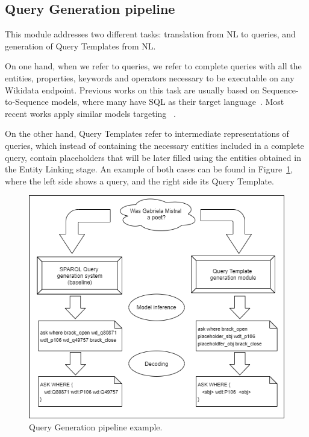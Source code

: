 \subsection{Query Generation pipeline}
\label{cap3:system/queryGenModule/pipeline}
This module addresses two different tasks: translation from NL to \SPARQL{} queries, and 
generation of Query Templates from NL. 

On one hand, when we refer to \SPARQL{} queries, we refer to complete queries with all the 
entities, properties, \SPARQL{} keywords and operators necessary to be executable on any 
Wikidata endpoint. Previous works on this task are usually based on Sequence-to-Sequence 
models, where many have SQL as their target language~\cite{nmt:DongL16, nmt:CaiXZYLL18, 
nmt:ZhongCoRR17}. Most recent works apply similar models targeting \SPARQL{}~\cite{nmt:CoRRLuz18, 
nmt:nspm-SoruMMPVEN17, nmt:CoRRSoru18}.

On the other hand, Query Templates refer to intermediate representations of \SPARQL{} queries, 
which instead of containing the necessary entities included in a complete \SPARQL{} query, 
contain placeholders that will be later filled using the entities obtained in the Entity 
Linking stage. An example of both cases can be found in Figure~\ref{fig:queryGenerationOverview}, 
where the left side shows a \SPARQL{} query, and the right side its Query Template. 

\begin{figure}[!h]
    \centering
    \includegraphics[scale=.5]{imagenes/3_system_overview/queryGenerationPipeline.png}
    \caption{Query Generation pipeline example.}
    \label{fig:queryGenerationOverview}
\end{figure}

